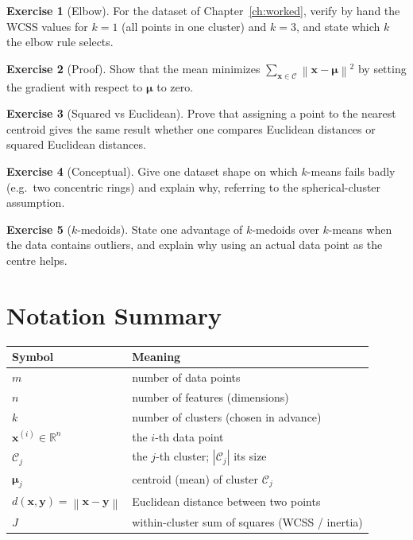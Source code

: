 \documentclass[11pt,a4paper]{report}
\theoremstyle{definition}
\newtheorem{exercise}{Exercise}[chapter]
\theoremstyle{plain}
\theoremstyle{remark}
\newcommand{\R}{\mathbb{R}}
\newcommand{\vx}{\mathbf{x}}
\newcommand{\vy}{\mathbf{y}}
\newcommand{\vmu}{\bm{\mu}}
\newcommand{\C}{\mathcal{C}}
\newcommand{\norm}[1]{\left\lVert #1 \right\rVert}
\begin{document}
	\begin{exercise}[Elbow]
		For the dataset of Chapter~\ref{ch:worked}, verify by hand the WCSS values for
		$k=1$ (all points in one cluster) and $k=3$, and state which $k$ the elbow rule
		selects.
	\end{exercise}
	
	\begin{exercise}[Proof]
		Show that the mean minimizes $\sum_{\vx\in\C}\norm{\vx-\vmu}^2$ by setting the
		gradient with respect to $\vmu$ to zero.
	\end{exercise}
	
	\begin{exercise}[Squared vs Euclidean]
		Prove that assigning a point to the nearest centroid gives the same result
		whether one compares Euclidean distances or squared Euclidean distances.
	\end{exercise}
	
	\begin{exercise}[Conceptual]
		Give one dataset shape on which $k$-means fails badly (e.g.\ two concentric
		rings) and explain why, referring to the spherical-cluster assumption.
	\end{exercise}
	
	\begin{exercise}[$k$-medoids]
		State one advantage of $k$-medoids over $k$-means when the data contains
		outliers, and explain why using an actual data point as the centre helps.
	\end{exercise}
	
	\appendix
	\chapter{Notation Summary}
	\begin{center}
		\begin{tabular}{@{}ll@{}}
			\toprule
			Symbol & Meaning\\
			\midrule
			$m$ & number of data points\\
			$n$ & number of features (dimensions)\\
			$k$ & number of clusters (chosen in advance)\\
			$\vx^{(i)}\in\R^n$ & the $i$-th data point\\
			$\C_j$ & the $j$-th cluster; $|\C_j|$ its size\\
			$\vmu_j$ & centroid (mean) of cluster $\C_j$\\
			$d(\vx,\vy)=\norm{\vx-\vy}$ & Euclidean distance between two points\\
			$J$ & within-cluster sum of squares (WCSS / inertia)\\
			\bottomrule
		\end{tabular}
	\end{center}
	
\end{document}
